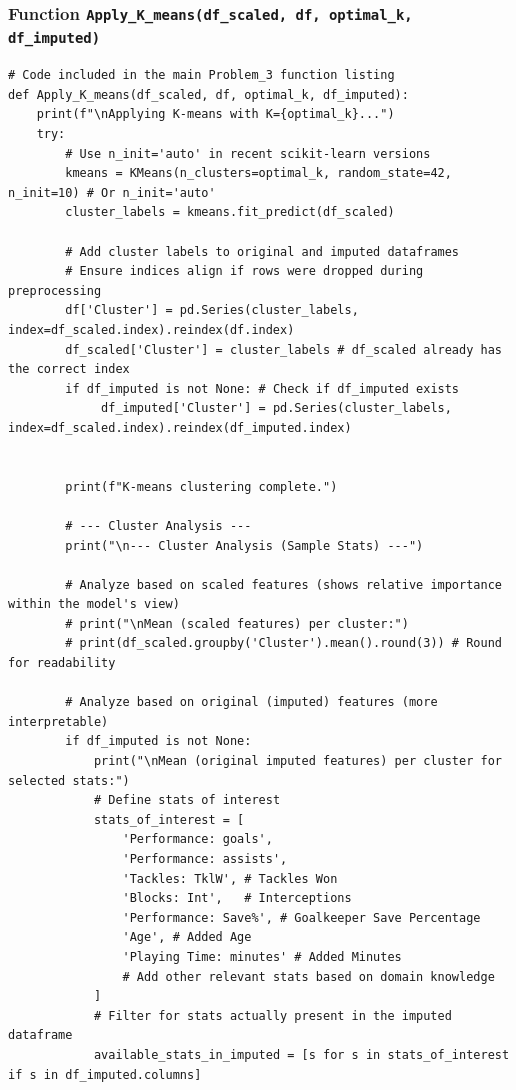 \documentclass[12pt]{report}
\begin{document}
{{{\subsubsection{Function \texttt{Apply\_K\_means(df\_scaled, df, optimal\_k, df\_imputed)}} %
\begin{lstlisting}
# Code included in the main Problem_3 function listing
def Apply_K_means(df_scaled, df, optimal_k, df_imputed):
    print(f"\nApplying K-means with K={optimal_k}...")
    try:
        # Use n_init='auto' in recent scikit-learn versions
        kmeans = KMeans(n_clusters=optimal_k, random_state=42, n_init=10) # Or n_init='auto'
        cluster_labels = kmeans.fit_predict(df_scaled)

        # Add cluster labels to original and imputed dataframes
        # Ensure indices align if rows were dropped during preprocessing
        df['Cluster'] = pd.Series(cluster_labels, index=df_scaled.index).reindex(df.index)
        df_scaled['Cluster'] = cluster_labels # df_scaled already has the correct index
        if df_imputed is not None: # Check if df_imputed exists
             df_imputed['Cluster'] = pd.Series(cluster_labels, index=df_scaled.index).reindex(df_imputed.index)


        print(f"K-means clustering complete.")

        # --- Cluster Analysis ---
        print("\n--- Cluster Analysis (Sample Stats) ---")

        # Analyze based on scaled features (shows relative importance within the model's view)
        # print("\nMean (scaled features) per cluster:")
        # print(df_scaled.groupby('Cluster').mean().round(3)) # Round for readability

        # Analyze based on original (imputed) features (more interpretable)
        if df_imputed is not None:
            print("\nMean (original imputed features) per cluster for selected stats:")
            # Define stats of interest
            stats_of_interest = [
                'Performance: goals',
                'Performance: assists',
                'Tackles: TklW', # Tackles Won
                'Blocks: Int',   # Interceptions
                'Performance: Save%', # Goalkeeper Save Percentage
                'Age', # Added Age
                'Playing Time: minutes' # Added Minutes
                # Add other relevant stats based on domain knowledge
            ]
            # Filter for stats actually present in the imputed dataframe
            available_stats_in_imputed = [s for s in stats_of_interest if s in df_imputed.columns]


\end{lstlisting}}}}
\end{document}
